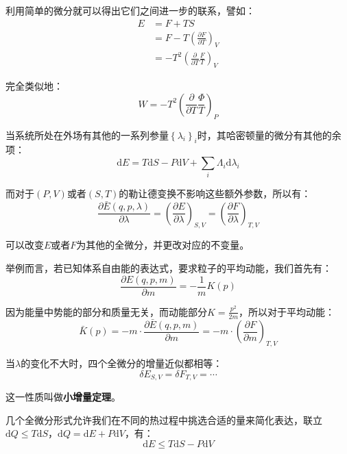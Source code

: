 \documentclass[UTF8]{ctexart}
\begin{document}
\begin{spacing}{2.0}
利用简单的微分就可以得出它们之间进一步的联系，譬如：
\begin{equation}
\begin{aligned}
E&=F+TS \\
&=F - T\left(\frac{\partial F}{\partial T} \right)_{V} \\ 
&=-T^{2}\left(\frac{\partial}{\partial T}\frac{F}{T} \right)_{V}
\end{aligned}
\end{equation}

完全类似地：
\begin{equation}
W=-T^{2}\left(\frac{\partial}{\partial T}\frac{\Phi}{T} \right)_{P}
\end{equation}

当系统所处在外场有其他的一系列参量$\left\{\lambda_{i} \right\}_{i}$时，其哈密顿量的微分有其他的余项：
\begin{equation}
\text{d}E=T\text{d}S-P\text{d}V+\sum_{i}\Lambda_{i}\text{d}\lambda_{i}
\end{equation}

而对于$(P,V)$或者$(S,T)$的勒让德变换不影响这些额外参数，所以有：
\begin{equation}
\frac{\partial \bar{E}(q,p,\lambda)}{\partial \lambda}=\left(\frac{\partial E}{\partial \lambda} \right)_{S,V}=\left(\frac{\partial F}{\partial \lambda} \right)_{T,V}
\end{equation}

可以改变$E$或者$F$为其他的全微分，并更改对应的不变量。

举例而言，若已知体系自由能的表达式，要求粒子的平均动能，我们首先有：
\begin{equation}
\frac{\partial E(q,p,m)}{\partial m}=-\frac{1}{m}K(p)
\end{equation}

因为能量中势能的部分和质量无关，而动能部分$K=\frac{p^{2}}{2m}$，所以对于平均动能：
\begin{equation}
\bar{K}(p)=-m\cdot \frac{\partial \bar{E}(q,p,m)}{\partial m}=-m\cdot \left(\frac{\partial F}{\partial m} \right)_{T,V}
\end{equation}

当$\lambda$的变化不大时，四个全微分的增量近似都相等：
\begin{equation}
\delta E_{S,V}=\delta F_{T,V}=\cdots
\end{equation}

这一性质叫做\textbf{小增量定理}。

几个全微分形式允许我们在不同的热过程中挑选合适的量来简化表达，联立$\text{d}Q \leq T\text{d}S$，$\text{d}Q=\text{d}E+P\text{d}V$，有：
\begin{equation}
\text{d}E\leq T\text{d}S - P\text{d}V
\end{equation}


\end{spacing}
\end{document}
